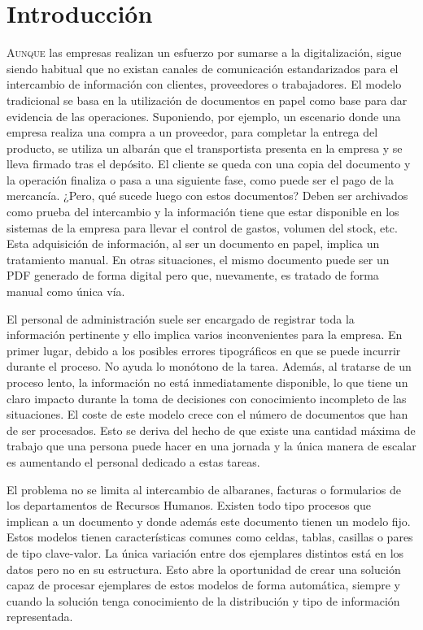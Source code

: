 
\chapter{Introducción}
\label{chap:introduccion}

\lettrine{A}{unque} las empresas realizan un esfuerzo por sumarse a la digitalización, sigue siendo habitual que no existan canales de comunicación estandarizados para el intercambio de información con clientes, proveedores o trabajadores. El modelo tradicional se basa en la utilización de documentos en papel como base para dar evidencia de las operaciones. Suponiendo, por ejemplo, un escenario donde una empresa realiza una compra a un proveedor, para completar la entrega del producto, se utiliza un albarán que el transportista presenta en la empresa y se lleva firmado tras el depósito. El cliente se queda con una copia del documento y la operación finaliza o pasa a una siguiente fase, como puede ser el pago de la mercancía. ¿Pero, qué sucede luego con estos documentos? Deben ser archivados como prueba del intercambio y la información tiene que estar disponible en los sistemas de la empresa para llevar el control de gastos, volumen del stock, etc. Esta adquisición de información, al ser un documento en papel, implica un tratamiento manual. En otras situaciones, el mismo documento puede ser un PDF generado de forma digital pero que, nuevamente, es tratado de forma manual como única vía.

El personal de administración suele ser encargado de registrar toda la información pertinente y ello implica varios inconvenientes para la empresa. En primer lugar, debido a los posibles errores tipográficos en que se puede incurrir durante el proceso. No ayuda lo monótono de la tarea. Además, al tratarse de un proceso lento, la información no está inmediatamente disponible, lo que tiene un claro impacto durante la toma de decisiones con conocimiento incompleto de las situaciones. El coste de este modelo crece con el número de documentos que han de ser procesados. Esto se deriva del hecho de que existe una cantidad máxima de trabajo que una persona puede hacer en una jornada y la única manera de escalar es aumentando el personal dedicado a estas tareas.

El problema no se limita al intercambio de albaranes, facturas o formularios de los departamentos de Recursos Humanos. Existen todo tipo procesos que implican a un documento y donde además este documento tienen un modelo fijo. Estos modelos tienen características comunes como celdas, tablas, casillas o pares de tipo clave-valor. La única variación entre dos ejemplares distintos está en los datos pero no en su estructura. Esto abre la oportunidad de crear una solución capaz de procesar ejemplares de estos modelos de forma automática, siempre y cuando la solución tenga conocimiento de la distribución y tipo de información representada. 

